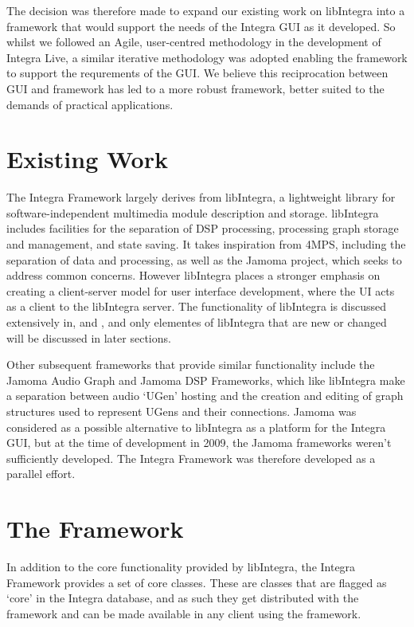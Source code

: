 \documentclass[twoside,10pt,a4paper]{article}
\begin{document}
The decision was therefore made to expand our existing work on libIntegra into a framework that would support the needs of the Integra GUI as it developed. So whilst we followed an Agile, user-centred methodology in the development of Integra Live, a similar iterative methodology was adopted enabling the framework to support the requrements of the GUI. We believe this reciprocation between GUI and framework has led to a more robust framework, better suited to the demands of practical applications.

\section{Existing Work}\label{sec:existing_work}

The Integra Framework largely derives from libIntegra, a lightweight library for software-independent multimedia module description and storage\cite{Bullock:03}. libIntegra includes facilities for the separation of DSP processing, processing graph storage and management, and state saving. It takes inspiration from 4MPS, including the separation of data and processing\cite{Amatriain:00}, as well as the Jamoma project, which seeks to address common concerns\cite{Place:02}. However libIntegra places a stronger emphasis on creating a client-server model for user interface development, where the UI acts as a client to the libIntegra server. The functionality of libIntegra is discussed extensively in\cite{Bullock:03}, \cite{Bullock:02} and \cite{Bullock:00}, and only elementes of libIntegra that are new or changed will be discussed in later sections.

Other subsequent frameworks that provide similar functionality include the Jamoma Audio Graph and Jamoma DSP Frameworks, which like libIntegra make a separation between audio `UGen' hosting and the creation and editing of graph structures used to represent UGens and their connections\cite{Place:00}. Jamoma was considered as a possible alternative to libIntegra as a platform for the Integra GUI, but at the time of development in 2009, the Jamoma frameworks weren't sufficiently developed. The Integra Framework was therefore developed as a parallel effort.


\section{The Framework}\label{sec:the_framework}

In addition to the core functionality provided by libIntegra, the Integra Framework provides a set of core classes. These are classes that are flagged as `core' in the Integra database, and as such they get distributed with the framework and can be made available in any client using the framework.
\end{document}
